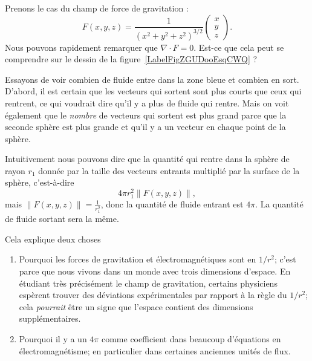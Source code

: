 \begin{example}
    Prenons le cas du champ de force de gravitation :
    \begin{equation}
        F(x,y,z)=\frac{1}{ (x^2+y^2+z^2)^{3/2} }\begin{pmatrix}
            x    \\
            y   \\
            z
        \end{pmatrix}.
    \end{equation}
    Nous pouvons rapidement remarquer que $\nabla\cdot F=0$. Est-ce que cela peut se comprendre sur le dessin de la figure~\ref{LabelFigZGUDooEsqCWQ} ? %
\newcommand{\CaptionFigZGUDooEsqCWQ}{Le champ de vecteur de la gravité. Nous avons tracé, sur les deux cercles la même densité de vecteurs, c'est-à-dire le même nombre de vecteurs par unité de surface.}


    Essayons de voir combien de fluide entre dans la zone bleue et combien en sort. D'abord, il est certain que les vecteurs qui sortent sont plus courts que ceux qui rentrent, ce qui voudrait dire qu'il y a plus de fluide qui rentre. Mais on voit également que le \emph{nombre} de vecteurs qui sortent est plus grand parce que la seconde sphère est plus grande et qu'il y a un vecteur en chaque point de la sphère.

    Intuitivement nous pouvons dire que la quantité qui rentre dans la sphère de rayon $r_1$ donnée par la taille des vecteurs entrants multiplié par la surface de la sphère, c'est-à-dire
    \begin{equation}        \label{EqQpinormeVecto}
        4\pi r_1^2\| F(x,y,z) \|,
    \end{equation}
    mais $\| F(x,y,z) \|=\frac{1}{ r_1^2 }$, donc la quantité de fluide entrant est $4\pi$. La quantité de fluide sortant sera la même.

    Cela explique deux choses
    \begin{enumerate}
        \item
            Pourquoi les forces de gravitation et électromagnétiques sont en $1/r^2$; c'est parce que nous vivons dans un monde avec trois dimensions d'espace. En étudiant très précisément le champ de gravitation, certains physiciens espèrent trouver des déviations expérimentales par rapport à la règle du \( 1/r^2\); cela \emph{pourrait} être un signe que l'espace contient des dimensions supplémentaires.
        \item
            Pourquoi il y a un $4\pi$ comme coefficient dans beaucoup d'équations en électromagnétisme; en particulier dans certaines anciennes unités de flux.
    \end{enumerate}

\end{example}

